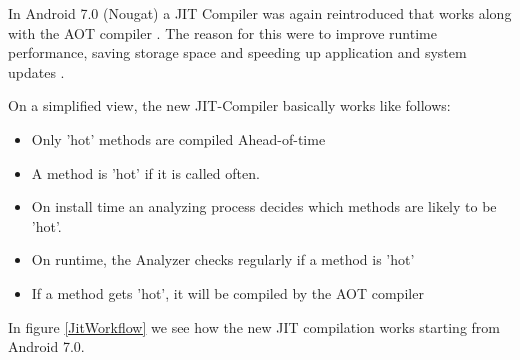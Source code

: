 In Android 7.0 (Nougat) a JIT Compiler was again reintroduced that works along with the AOT compiler \cite{Android7ForDevelopers}. The reason for this were to improve runtime performance, saving storage space and speeding up application and system updates \cite{JitWorkFlow}.

On a simplified view, the new JIT-Compiler basically works like follows:  


\begin{itemize}
    \item Only 'hot' methods are compiled Ahead-of-time 
    \item A method is 'hot' if it is called often.
    \item On install time an analyzing process decides which methods are likely to be 'hot'.
    \item On runtime, the Analyzer checks regularly if a method is 'hot'
    \item If a method gets 'hot', it will be compiled by the AOT compiler
    \end{itemize}
    
In figure \ref{JitWorkflow} we see how the new JIT compilation works starting from Android 7.0.     
    
